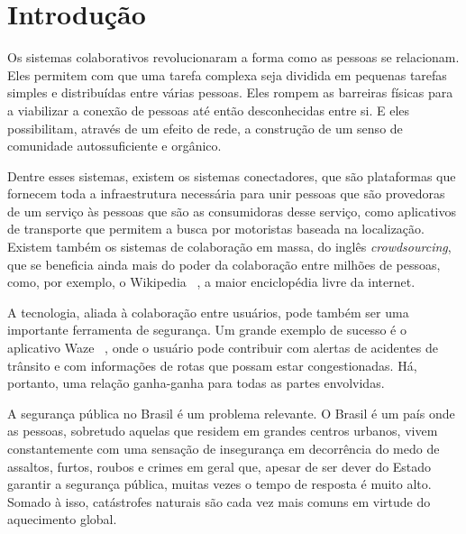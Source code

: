 \chapter{Introdução}
\label{c.introducao}

Os sistemas colaborativos revolucionaram a forma como as pessoas se relacionam. Eles permitem com que uma tarefa complexa seja dividida em pequenas tarefas simples e distribuídas entre várias pessoas. Eles rompem as barreiras físicas para a viabilizar a conexão de pessoas até então desconhecidas entre si. E eles possibilitam, através de um efeito de rede, a construção de um senso de comunidade autossuficiente e orgânico.

Dentre esses sistemas, existem os sistemas conectadores, que são plataformas que fornecem toda a infraestrutura necessária para unir pessoas que são provedoras de um serviço às pessoas que são as consumidoras desse serviço, como aplicativos de transporte que permitem a busca por motoristas baseada na localização. Existem também os sistemas de colaboração em massa, do inglês \emph{crowdsourcing}, que se beneficia ainda mais do poder da colaboração entre milhões de pessoas, como, por exemplo, o Wikipedia ~\cite{wikipedia}, a maior enciclopédia livre da internet.

A tecnologia, aliada à colaboração entre usuários, pode também ser uma importante ferramenta de segurança. Um grande exemplo de sucesso é o aplicativo Waze ~\cite{waze}, onde o usuário pode contribuir com alertas de acidentes de trânsito e com informações de rotas que possam estar congestionadas. Há, portanto, uma relação ganha-ganha para todas as partes envolvidas.


A segurança pública no Brasil é um problema relevante. O Brasil é um país onde as pessoas, sobretudo aquelas que residem em grandes centros urbanos, vivem constantemente com uma sensação de insegurança em decorrência do medo de assaltos, furtos, roubos e crimes em geral que, apesar de ser dever do Estado garantir a segurança pública, muitas vezes o tempo de resposta é muito alto. Somado à isso, catástrofes naturais são cada vez mais comuns em virtude do aquecimento global.


